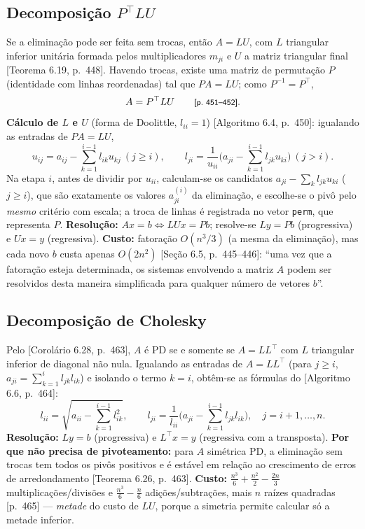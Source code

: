 \documentclass{article}
\newcommand{\T}{^{\top}}
\newcommand{\burden}[1]{\textsf{\footnotesize[#1]}}
\theoremstyle{remark}
\begin{document}
\subsection{Decomposição $P\T LU$}
Se a eliminação pode ser feita sem trocas, então $A=LU$, com $L$ triangular inferior unitária formada pelos
multiplicadores $m_{ji}$ e $U$ a matriz triangular final \burden{Teorema 6.19, p.~448}. Havendo trocas, existe uma
matriz de permutação $P$ (identidade com linhas reordenadas) tal que $PA=LU$; como $P^{-1}=P\T$,
\[
A=P\T LU \qquad\burden{p.~451--452}.
\]
\textbf{Cálculo de $L$ e $U$} (forma de Doolittle, $l_{ii}=1$) \burden{Algoritmo 6.4, p.~450}: igualando as entradas de
$PA=LU$,
\[
u_{ij}=a_{ij}-\sum_{k=1}^{i-1}l_{ik}u_{kj}\ (j\ge i),\qquad
l_{ji}=\frac{1}{u_{ii}}\Big(a_{ji}-\sum_{k=1}^{i-1}l_{jk}u_{ki}\Big)\ (j>i).
\]
Na etapa $i$, antes de dividir por $u_{ii}$, calculam-se os candidatos $a_{ji}-\sum_k l_{jk}u_{ki}$ ($j\ge i$),
que são exatamente os valores $a^{(i)}_{ji}$ da eliminação, e escolhe-se o pivô pelo \emph{mesmo} critério com
escala; a troca de linhas é registrada no vetor \texttt{perm}, que representa $P$.
\textbf{Resolução:} $Ax=b\iff LUx=Pb$; resolve-se $Ly=Pb$ (progressiva) e $Ux=y$ (regressiva).
\textbf{Custo:} fatoração $O(n^3/3)$ (a mesma da eliminação), mas cada novo $b$ custa apenas $O(2n^2)$
\burden{Seção 6.5, p.~445--446}: ``uma vez que a fatoração esteja determinada, os sistemas envolvendo a matriz $A$
podem ser resolvidos desta maneira simplificada para qualquer número de vetores $b$''.

\subsection{Decomposição de Cholesky}
Pelo \burden{Corolário 6.28, p.~463}, $A$ é PD se e somente se $A=LL\T$ com $L$ triangular inferior de
diagonal não nula. Igualando as entradas de $A=LL\T$ (para $j\ge i$, $a_{ji}=\sum_{k=1}^{i}l_{jk}l_{ik}$) e isolando
o termo $k=i$, obtêm-se as fórmulas do \burden{Algoritmo 6.6, p.~464}:
\[
l_{ii}=\sqrt{a_{ii}-\sum_{k=1}^{i-1}l_{ik}^2},\qquad
l_{ji}=\frac{1}{l_{ii}}\Big(a_{ji}-\sum_{k=1}^{i-1}l_{jk}l_{ik}\Big),\quad j=i+1,\dots,n.
\]
\textbf{Resolução:} $Ly=b$ (progressiva) e $L\T x=y$ (regressiva com a transposta).
\textbf{Por que não precisa de pivoteamento:} para $A$ simétrica PD, a eliminação sem trocas tem todos os pivôs
positivos e é estável em relação ao crescimento de erros de arredondamento \burden{Teorema 6.26, p.~463}.
\textbf{Custo:} $\frac{n^3}{6}+\frac{n^2}{2}-\frac{2n}{3}$ multiplicações/divisões e $\frac{n^3}{6}-\frac n6$
adições/subtrações, mais $n$ raízes quadradas \burden{p.~465} --- \emph{metade} do custo de $LU$, porque a simetria
permite calcular só a metade inferior.
\end{document}
